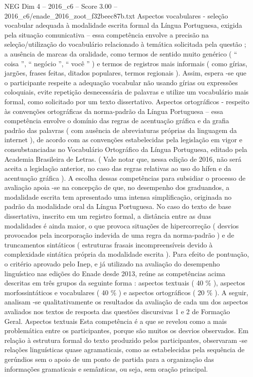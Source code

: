 \begin{textsample}{NEG Dim 4 – 2016\_c6 – Score 3.00 – 2016\_c6/enade\_2016\_zoot\_f32beec87b.txt}
Aspectos vocabulares - seleção vocabular adequada à modalidade escrita formal da Língua Portuguesa, exigida pela situação comunicativa – essa competência envolve a precisão na seleção/utilização do vocabulário relacionado à temática solicitada pela questão ; a ausência de marcas da oralidade, como termos de sentido muito genérico ( “ coisa ”, “ negócio ”, “ você ” ) e termos de registros mais informais ( como gírias, jargões, frases feitas, ditados populares, termos regionais ).
Assim, espera -se que o participante respeite a adequação vocabular não usando gírias ou expressões coloquiais, evite repetição desnecessária de palavras e utilize um vocabulário mais formal, como solicitado por um texto dissertativo.
Aspectos ortográficos - respeito às convenções ortográficas da norma-padrão da Língua Portuguesa – essa competência envolve o domínio das regras de acentuação gráfica e da grafia padrão das palavras ( com ausência de abreviaturas próprias da linguagem da internet ), de acordo com as convenções estabelecidas pela legislação em vigor e consubstanciadas no Vocabulário Ortográfico da Língua Portuguesa, editado pela Academia Brasileira de Letras. ( Vale notar que, nessa edição de 2016, não será aceita a legislação anterior, no caso das regras relativas ao uso do hífen e da acentuação gráfica ).
A escolha dessas competências para subsidiar o processo de avaliação apoia -se na concepção de que, no desempenho dos graduandos, a modalidade escrita tem apresentado uma intensa simplificação, originada no padrão da modalidade oral da Língua Portuguesa.
No caso do texto de base dissertativa, inscrito em um registro formal, a distância entre as duas modalidades é ainda maior, o que provoca situações de hipercorreção ( desvios provocados pela incorporação indevida de uma regra da norma-padrão ) e de truncamentos sintáticos ( estruturas frasais incompreensíveis devido à complexidade sintática própria da modalidade escrita ).
Para efeito de pontuação, o critério aprovado pelo Inep, e já utilizado na avaliação do desempenho linguístico nas edições do Enade desde 2013, reúne as competências acima descritas em três grupos da seguinte forma : aspectos textuais ( 40 \% ), aspectos morfossintáticos e vocabulares ( 40 \% ) e aspectos ortográficos ( 20 \% ).
A seguir, analisam -se qualitativamente os resultados da avaliação de cada um dos aspectos avaliados nos textos de resposta das questões discursivas 1 e 2 de Formação Geral.
Aspectos textuais Esta competência é a que se revelou como a mais problemática entre os participantes, porque são muitos os desvios observados.
Em relação à estrutura formal do texto produzido pelos participantes, observaram -se relações linguísticas quase agramaticais, como as estabelecidas pela sequência de gerúndios sem o apoio de um ponto de partida para a organização das informações gramaticais e semânticas, ou seja, sem oração principal.

\end{textsample}
